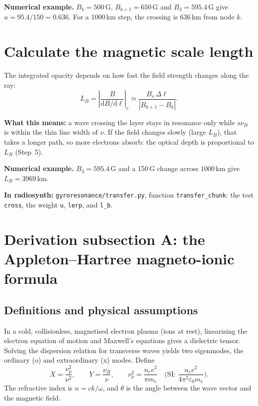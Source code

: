\documentclass[11pt,a4paper]{article}
\newcommand{\dd}{\mathrm{d}}
\newcommand{\nuB}{\nu_B}
\newcommand{\code}[1]{\texttt{#1}}
\newcommand{\example}[1]{\par\noindent\colorbox{boxbg}{\parbox{\dimexpr\linewidth-2\fboxsep}{\small\textbf{Numerical example.} #1}}\par}
\newcommand{\whatitmeans}[1]{\par{\color{head}\textbf{What this means:}} #1\par}
\newcommand{\incode}[1]{\par{\small\color{head!80!black}\textbf{In radiosynth:} #1}\par}
\begin{document}
\example{$B_k=500$\,G, $B_{k+1}=650$\,G and $B_3=595.4$\,G give $u=95.4/150=0.636$. For a
1000\,km step, the crossing is 636\,km from node $k$.}

\section{Calculate the magnetic scale length}
The integrated opacity depends on how fast the field strength changes along the ray:
\begin{equation}
  L_B=\left|\frac{B}{\dd B/\dd\ell}\right|_c\simeq\frac{B_s\,\Delta\ell}{|B_{k+1}-B_k|}.
\end{equation}
\whatitmeans{a wave crossing the layer stays in resonance only while $s\nuB$ is within the thin line width of
$\nu$. If the field changes slowly (large $L_B$), that takes a longer path, so more electrons absorb: the
optical depth is proportional to $L_B$ (Step~5).}
\example{$B_3=595.4$\,G and a 150\,G change across 1000\,km give $L_B=3969$\,km.}
\incode{\code{gyroresonance/transfer.py}, function \code{transfer\_chunk}: the test \code{cross},
the weight \code{u}, \code{lerp}, and \code{l\_b}.}

\section{Derivation subsection A: the Appleton--Hartree magneto-ionic formula}
\subsection{Definitions and physical assumptions}
In a cold, collisionless, magnetised electron plasma (ions at rest), linearising the electron
equation of motion and Maxwell's equations gives a dielectric tensor. Solving the dispersion
relation for transverse waves yields two eigenmodes, the ordinary (o) and extraordinary (x)
modes. Define
\begin{equation}
  X=\frac{\nu_p^2}{\nu^2},\qquad Y=\frac{\nuB}{\nu},\qquad
  \nu_p^2=\frac{n_ee^2}{\pi m_e}\quad\Big(\text{SI: } \frac{n_ee^2}{4\pi^2\varepsilon_0m_e}\Big).
\end{equation}
The refractive index is $n=ck/\omega$, and $\theta$ is the angle between the wave vector and the
magnetic field.
\end{document}
